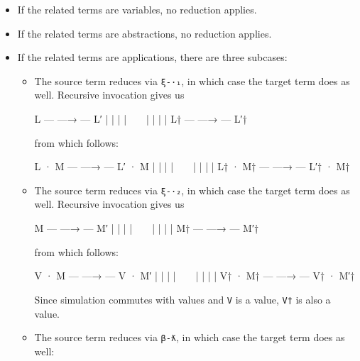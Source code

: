 \begin{itemize}
\item
  If the related terms are variables, no reduction applies.
\item
  If the related terms are abstractions, no reduction applies.
\item
  If the related terms are applications, there are three subcases:

  \begin{itemize}
  \item
    The source term reduces via \texttt{ξ-·₁}, in which case the target
    term does as well. Recursive invocation gives us

    \begin{myDisplay}
    L  --- —→ ---  L′
    |              |
    |              |
    ~              ~
    |              |
    |              |
    L† --- —→ --- L′†
    \end{myDisplay}

    from which follows:

    \begin{myDisplay}
     L · M  --- —→ ---  L′ · M
       |                   |
       |                   |
       ~                   ~
       |                   |
       |                   |
    L† · M† --- —→ --- L′† · M†
    \end{myDisplay}
  \item
    The source term reduces via \texttt{ξ-·₂}, in which case the target
    term does as well. Recursive invocation gives us

    \begin{myDisplay}
    M  --- —→ ---  M′
    |              |
    |              |
    ~              ~
    |              |
    |              |
    M† --- —→ --- M′†
    \end{myDisplay}

    from which follows:

    \begin{myDisplay}
     V · M  --- —→ ---  V · M′
       |                  |
       |                  |
       ~                  ~
       |                  |
       |                  |
    V† · M† --- —→ --- V† · M′†
    \end{myDisplay}

    Since simulation commutes with values and \texttt{V} is a value,
    \texttt{V†} is also a value.
  \item
    The source term reduces via \texttt{β-ƛ}, in which case the target
    term does as well:


\end{itemize}
\end{itemize}
